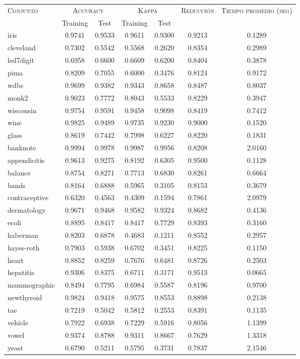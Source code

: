 \begin{table}[]
\centering
\begin{tabular}{l c c c c c c}
\hline
\multirow{2}{*}{\textsc{Conjunto}}
	& \multicolumn{2}{c}{\textsc{Accuracy}}
	& \multicolumn{2}{c}{\textsc{Kappa}}
	& \textsc{Reducción}
	& \textsc{Tiempo promedio (seg)} \\
	& Training & Test
	& Training & Test \\ 
\hline
\hline

iris & 0.9741 & 0.9533 & 0.9611 & 0.9300 & 0.9213 & 0.1289 \\
cleveland & 0.7302 & 0.5542 & 0.5568 & 0.2620 & 0.8354 & 0.2989 \\
led7digit & 0.6958 & 0.6600 & 0.6609 & 0.6200 & 0.8404 & 0.3878 \\
pima & 0.8209 & 0.7055 & 0.6000 & 0.3476 & 0.8124 & 0.9172 \\
wdbc & 0.9699 & 0.9382 & 0.9343 & 0.8658 & 0.8487 & 0.8037 \\
monk2 & 0.9023 & 0.7772 & 0.8043 & 0.5533 & 0.8229 & 0.3947 \\
wisconsin & 0.9754 & 0.9591 & 0.9458 & 0.9098 & 0.8419 & 0.7412 \\
wine & 0.9825 & 0.9489 & 0.9735 & 0.9230 & 0.9000 & 0.1520 \\
glass & 0.8619 & 0.7442 & 0.7998 & 0.6227 & 0.8220 & 0.1831 \\
banknote & 0.9994 & 0.9978 & 0.9987 & 0.9956 & 0.8208 & 2.0160 \\
appendicitis & 0.9613 & 0.9275 & 0.8192 & 0.6305 & 0.9500 & 0.1128 \\
balance & 0.8754 & 0.8271 & 0.7713 & 0.6830 & 0.8261 & 0.6664 \\
bands & 0.8164 & 0.6888 & 0.5965 & 0.3105 & 0.8153 & 0.3679 \\
contraceptive & 0.6320 & 0.4563 & 0.4309 & 0.1594 & 0.7861 & 2.0979 \\
dermatology & 0.9671 & 0.9468 & 0.9582 & 0.9324 & 0.8682 & 0.4136 \\
ecoli & 0.8895 & 0.8417 & 0.8417 & 0.7729 & 0.8393 & 0.3160 \\
haberman & 0.8203 & 0.6878 & 0.4683 & 0.1211 & 0.8552 & 0.2957 \\
hayes-roth & 0.7903 & 0.5938 & 0.6702 & 0.3451 & 0.8225 & 0.1150 \\
heart & 0.8852 & 0.8259 & 0.7676 & 0.6481 & 0.8726 & 0.2503 \\
hepatitis & 0.9306 & 0.8375 & 0.6711 & 0.3171 & 0.9513 & 0.0665 \\
mammographic & 0.8494 & 0.7795 & 0.6984 & 0.5587 & 0.8196 & 0.9700 \\
newthyroid & 0.9824 & 0.9418 & 0.9575 & 0.8553 & 0.8898 & 0.2138 \\
tae & 0.7219 & 0.5042 & 0.5812 & 0.2553 & 0.8391 & 0.1135 \\
vehicle & 0.7922 & 0.6938 & 0.7229 & 0.5916 & 0.8056 & 1.1399 \\
vowel & 0.9374 & 0.8788 & 0.9311 & 0.8667 & 0.7629 & 1.3318 \\
yeast & 0.6790 & 0.5211 & 0.5795 & 0.3731 & 0.7837 & 2.1546 \\


\end{tabular}
\end{table}
